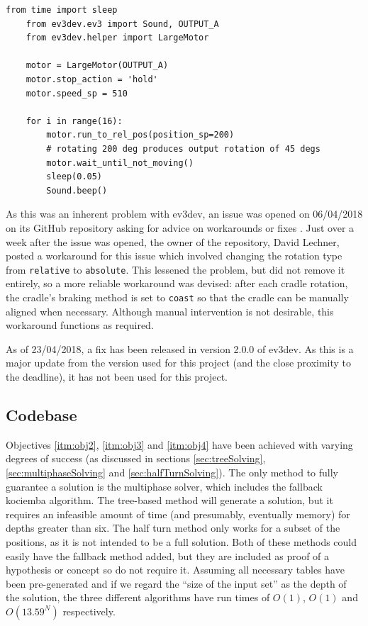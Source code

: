 \documentclass{report}
\newenvironment{aside}
{\begin{mdframed}[style=0,%
		leftline=false,rightline=false,leftmargin=2em,rightmargin=2em,%
		innerleftmargin=0pt,innerrightmargin=0pt,linewidth=0.75pt,%
		skipabove=7pt,skipbelow=7pt]\small}
	{\end{mdframed}}
\begin{document}
    \begin{lstlisting}[caption={A short script to test the cradle's accuracy}, label={lst:cradleAccuracyTest}]
    from time import sleep
    from ev3dev.ev3 import Sound, OUTPUT_A
    from ev3dev.helper import LargeMotor
    
    motor = LargeMotor(OUTPUT_A)
    motor.stop_action = 'hold'
    motor.speed_sp = 510
    
    for i in range(16):
	    motor.run_to_rel_pos(position_sp=200)
	    # rotating 200 deg produces output rotation of 45 degs
	    motor.wait_until_not_moving()
	    sleep(0.05)
	    Sound.beep()\end{lstlisting}
    
    As this was an inherent problem with ev3dev, an issue was opened on 06/04/2018 on its GitHub repository asking for advice on workarounds or fixes \cite{Worgarside2018}. Just over a week after the issue was opened, the owner of the repository, David Lechner, posted a workaround for this issue which involved changing the rotation type from \lstinline|relative| to \lstinline|absolute|. This lessened the problem, but did not remove it entirely, so a more reliable workaround was devised: after each cradle rotation, the cradle's braking method is set to \lstinline|coast| so that the cradle can be manually aligned when necessary. Although manual intervention is not desirable, this workaround functions as required.
    
    \begin{aside}
    	As of 23/04/2018, a fix has been released in version 2.0.0 of ev3dev. As this is a major update from the version used for this project (and the close proximity to the deadline), it has not been used for this project.
    \end{aside}
    
    \subsection{Codebase} \label{sec:objectivesCodebase}
    
    Objectives \ref{itm:obj2}, \ref{itm:obj3} and \ref{itm:obj4} have been achieved with varying degrees of success (as discussed in sections \ref{sec:treeSolving}, \ref{sec:multiphaseSolving} and \ref{sec:halfTurnSolving}). The only method to fully guarantee a solution is the multiphase solver, which includes the fallback kociemba algorithm. The tree-based method will generate a solution, but it requires an infeasible amount of time (and presumably, eventually memory) for depths greater than six. The half turn method only works for a subset of the positions, as it is not intended to be a full solution. Both of these methods could easily have the fallback method added, but they are included as proof of a hypothesis or concept so do not require it. Assuming all necessary tables have been pre-generated and if we regard the \enquote{size of the input set} as the depth of the solution, the three different algorithms have run times of $O(1)$, $O(1)$ and $O(13.59^N)$ respectively.
    
\end{document}
